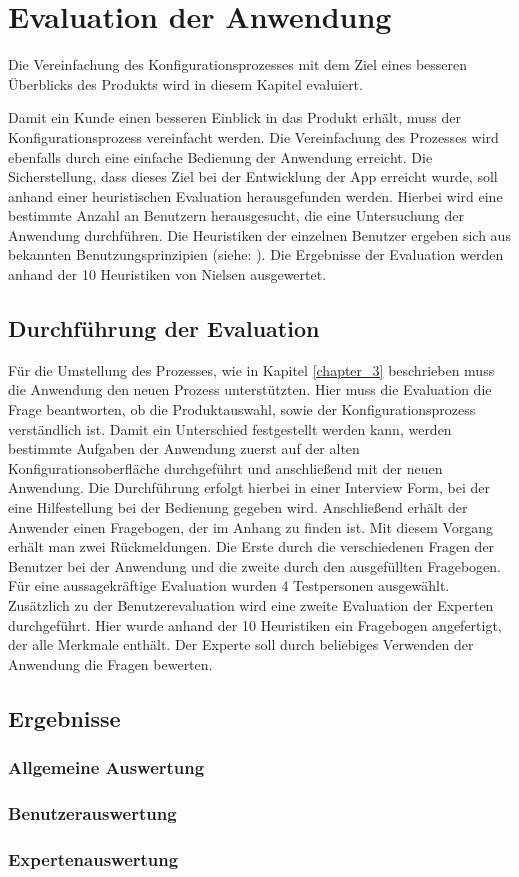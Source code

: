 \chapter{Evaluation der Anwendung}\label{chapter_6}
Die Vereinfachung des Konfigurationsprozesses mit dem Ziel eines besseren Überblicks des Produkts wird in diesem Kapitel evaluiert. 


Damit ein Kunde einen besseren Einblick in das Produkt erhält, muss der Konfigurationsprozess vereinfacht werden. Die Vereinfachung des Prozesses wird ebenfalls durch eine einfache Bedienung der Anwendung erreicht. Die Sicherstellung, dass dieses Ziel bei der Entwicklung der App erreicht wurde, soll anhand einer heuristischen Evaluation herausgefunden werden. Hierbei wird eine bestimmte Anzahl an Benutzern herausgesucht, die eine Untersuchung der Anwendung durchführen. Die Heuristiken der einzelnen Benutzer ergeben sich aus bekannten Benutzungsprinzipien (siehe: \cite{bib:heuristik1}). Die Ergebnisse der Evaluation werden anhand der 10 Heuristiken von Nielsen \cite{bib:heuristik2} ausgewertet.


\section{Durchführung der Evaluation}
Für die Umstellung des Prozesses, wie in Kapitel \ref{chapter_3} beschrieben muss die Anwendung den neuen Prozess unterstützten. Hier muss die Evaluation die Frage beantworten, ob die Produktauswahl, sowie der Konfigurationsprozess verständlich ist. Damit ein Unterschied festgestellt werden kann, werden bestimmte Aufgaben der Anwendung zuerst auf der alten Konfigurationsoberfläche durchgeführt und anschließend mit der neuen Anwendung. Die Durchführung erfolgt hierbei in einer Interview Form, bei der eine Hilfestellung bei der Bedienung gegeben wird. Anschließend erhält der Anwender einen Fragebogen, der im Anhang zu finden ist. Mit diesem Vorgang erhält man zwei Rückmeldungen. Die Erste durch die verschiedenen Fragen der Benutzer bei der Anwendung und die zweite durch den ausgefüllten Fragebogen. Für eine aussagekräftige Evaluation wurden 4 Testpersonen ausgewählt. Zusätzlich zu der Benutzerevaluation wird eine zweite Evaluation der Experten durchgeführt. Hier wurde anhand der 10 Heuristiken ein Fragebogen angefertigt, der alle Merkmale enthält. Der Experte soll durch beliebiges Verwenden der Anwendung die Fragen bewerten. 


\section{Ergebnisse}

\subsection{Allgemeine Auswertung}
\subsection{Benutzerauswertung}
\subsection{Expertenauswertung}
